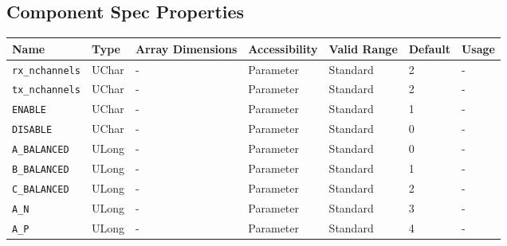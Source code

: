 \documentclass{article}
\begin{document}
\begin{landscape}

	\section*{Component Spec Properties}
	\begin{scriptsize}
		\begin{longtable}{|p{3.6cm}|p{8.1cm}|p{1.4cm}|p{1.3cm}|p{1.4cm}|p{2.5cm}|p{3.6cm}|}
			\hline
			\rowcolor{blue}
			Name               & Type & Array Dimensions & Accessibility      & Valid Range & Default & Usage                                                                               \\
			\hline
      \verb+rx_nchannels+              & UChar        & -               & Parameter             & Standard                         & 2                   & - \\
			\hline
      \verb+tx_nchannels+              & UChar        & -               & Parameter             & Standard                         & 2                   & - \\
			\hline
      \verb+ENABLE+                    & UChar        & -               & Parameter             & Standard                         & 1                   & - \\
			\hline
      \verb+DISABLE+                   & UChar        & -               & Parameter             & Standard                         & 0                   & - \\
			\hline
      \verb+A_BALANCED+                & ULong        & -               & Parameter             & Standard                         & 0                   & - \\
			\hline
      \verb+B_BALANCED+                & ULong        & -               & Parameter             & Standard                         & 1                   & - \\
			\hline
      \verb+C_BALANCED+                & ULong        & -               & Parameter             & Standard                         & 2                   & - \\
			\hline
      \verb+A_N+                       & ULong        & -               & Parameter             & Standard                         & 3                   & - \\
			\hline
      \verb+A_P+                       & ULong        & -               & Parameter             & Standard                         & 4                   & - \\

\end{longtable}
\end{scriptsize}
\end{landscape}
\end{document}
